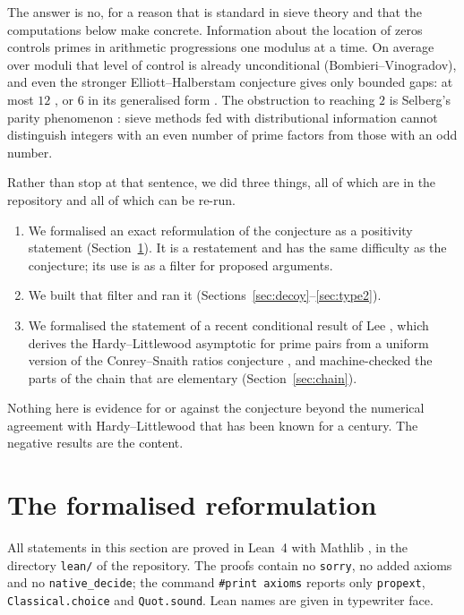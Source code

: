 \documentclass[11pt]{article}
\theoremstyle{definition}
\theoremstyle{remark}
\newcommand{\lean}[1]{\texttt{#1}}
\begin{document}
The answer is no, for a reason that is standard in sieve theory and that the
computations below make concrete. Information about the location of zeros
controls primes in arithmetic progressions one modulus at a time. On average over
moduli that level of control is already unconditional (Bombieri--Vinogradov), and
even the stronger Elliott--Halberstam conjecture gives only bounded gaps: at most
$12$ \cite{maynard}, or $6$ in its generalised form \cite{polymath}. The
obstruction to reaching $2$ is Selberg's parity phenomenon \cite{selberg}: sieve
methods fed with distributional information cannot distinguish integers with an
even number of prime factors from those with an odd number.

Rather than stop at that sentence, we did three things, all of which are in the
repository and all of which can be re-run.

\begin{enumerate}
\item We formalised an exact reformulation of the conjecture as a positivity
statement (Section~\ref{sec:lean}). It is a restatement and has the same
difficulty as the conjecture; its use is as a filter for proposed arguments.
\item We built that filter and ran it (Sections~\ref{sec:decoy}--\ref{sec:type2}).
\item We formalised the statement of a recent conditional result of Lee
\cite{lee}, which derives the Hardy--Littlewood asymptotic for prime pairs from
a uniform version of the Conrey--Snaith ratios conjecture \cite{conreysnaith},
and machine-checked the parts of the chain that are elementary
(Section~\ref{sec:chain}).
\end{enumerate}

Nothing here is evidence for or against the conjecture beyond the numerical
agreement with Hardy--Littlewood \cite{hl} that has been known for a century.
The negative results are the content.

\section{The formalised reformulation}\label{sec:lean}

All statements in this section are proved in Lean~4 with Mathlib
\cite{mathlib}, in the directory \lean{lean/} of the repository. The proofs
contain no \lean{sorry}, no added axioms and no \lean{native\_decide}; the
command \lean{\#print axioms} reports only \lean{propext},
\lean{Classical.choice} and \lean{Quot.sound}. Lean names are given in
typewriter face.
\end{document}
